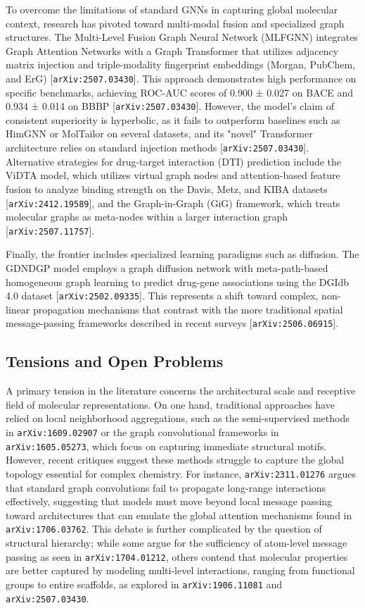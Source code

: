 \documentclass[11pt]{article}
\begin{document}
To overcome the limitations of standard GNNs in capturing global molecular context, research has pivoted toward multi-modal fusion and specialized graph structures. The Multi-Level Fusion Graph Neural Network (MLFGNN) integrates Graph Attention Networks with a Graph Transformer that utilizes adjacency matrix injection and triple-modality fingerprint embeddings (Morgan, PubChem, and ErG) [\texttt{arXiv:2507.03430}]. This approach demonstrates high performance on specific benchmarks, achieving ROC-AUC scores of 0.900 ± 0.027 on BACE and 0.934 ± 0.014 on BBBP [\texttt{arXiv:2507.03430}]. However, the model's claim of consistent superiority is hyperbolic, as it fails to outperform baselines such as HimGNN or MolTailor on several datasets, and its "novel" Transformer architecture relies on standard injection methods [\texttt{arXiv:2507.03430}]. Alternative strategies for drug-target interaction (DTI) prediction include the ViDTA model, which utilizes virtual graph nodes and attention-based feature fusion to analyze binding strength on the Davis, Metz, and KIBA datasets [\texttt{arXiv:2412.19589}], and the Graph-in-Graph (GiG) framework, which treats molecular graphs as meta-nodes within a larger interaction graph [\texttt{arXiv:2507.11757}].

Finally, the frontier includes specialized learning paradigms such as diffusion. The GDNDGP model employs a graph diffusion network with meta-path-based homogeneous graph learning to predict drug-gene associations using the DGIdb 4.0 dataset [\texttt{arXiv:2502.09335}]. This represents a shift toward complex, non-linear propagation mechanisms that contrast with the more traditional spatial message-passing frameworks described in recent surveys [\texttt{arXiv:2506.06915}].

\subsection{Tensions and Open Problems}

A primary tension in the literature concerns the architectural scale and receptive field of molecular representations. On one hand, traditional approaches have relied on local neighborhood aggregations, such as the semi-supervised methods in \texttt{arXiv:1609.02907} or the graph convolutional frameworks in \texttt{arXiv:1605.05273}, which focus on capturing immediate structural motifs. However, recent critiques suggest these methods struggle to capture the global topology essential for complex chemistry. For instance, \texttt{arXiv:2311.01276} argues that standard graph convolutions fail to propagate long-range interactions effectively, suggesting that models must move beyond local message passing toward architectures that can emulate the global attention mechanisms found in \texttt{arXiv:1706.03762}. This debate is further complicated by the question of structural hierarchy; while some argue for the sufficiency of atom-level message passing as seen in \texttt{arXiv:1704.01212}, others contend that molecular properties are better captured by modeling multi-level interactions, ranging from functional groups to entire scaffolds, as explored in \texttt{arXiv:1906.11081} and \texttt{arXiv:2507.03430}.
\end{document}
